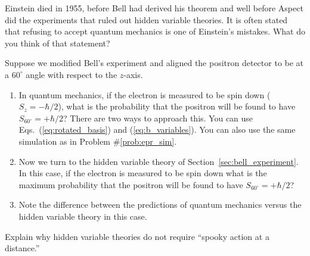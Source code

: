 \begin{problem}
  Einstein died in 1955, before Bell had derived his theorem and well
  before Aspect did the experiments that ruled out hidden variable
  theories.  It is often stated that refusing to accept quantum
  mechanics is one of Einstein's mistakes.  What do you think of that
  statement?
\end{problem}


\newpage 

\begin{problem}
Suppose we modified Bell's experiment and aligned the positron detector to be at a $60^\circ$ angle with respect to the $z$-axis.  
\begin{enumerate}
  \item In quantum mechanics, if the electron is measured to be spin
    down ($S_z=-\hbar/2$), what is the probability that the
    positron will be found to have $S_{60^\circ} =+\hbar/2$?  There are two ways to approach this.  You can use Eqs.~(\ref{eq:rotated_basis}) 
and (\ref{eq:b_variables}).  You can also use the same simulation as in Problem 
\#\ref{prob:epr_sim}.
  \item Now we turn to the hidden variable theory of
    Section~\ref{sec:bell_experiment}.  In this case, if the electron is
    measured to be spin down what is the maximum probability that the
    positron will be found to have $S_{60^\circ}=+\hbar/2$?
  \item Note the difference between the predictions of quantum mechanics 
    versus the hidden variable theory in this case.
\end{enumerate}
\end{problem}



\begin{problem}
  Explain why hidden variable theories do not require ``spooky action 
at a distance.''
\end{problem}





